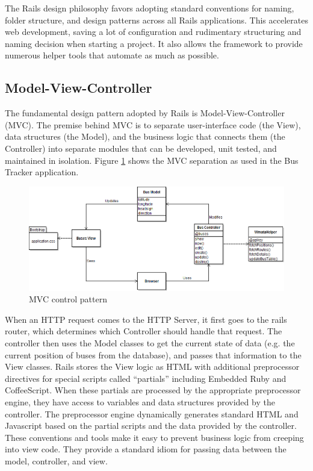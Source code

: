\documentclass[12pt]{article}
\begin{document}
The Rails design philosophy favors adopting standard conventions for naming, folder structure, and design patterns across all Rails applications.   This accelerates web development, saving a lot of configuration and rudimentary structuring and naming decision when starting a project.  It also allows the framework to provide numerous helper tools that automate as much as possible.


\subsection*{Model-View-Controller}
The fundamental design pattern adopted by Rails is Model-View-Controller (MVC).  The premise behind MVC is to separate user-interface code (the View), data structures (the Model), and the business logic that connects them (the Controller) into separate modules that can be developed, unit tested, and maintained in isolation.  Figure \ref{fig:MVC} shows the MVC separation as used in the Bus Tracker application.

\begin{figure}[ht]
	\centerline{\includegraphics[scale=0.55]{busTrackerUML.png}}
	\caption{MVC control pattern}
	\label{fig:MVC}
\end{figure}

When an HTTP request comes to the HTTP Server, it first goes to the rails router, which determines which Controller should handle that request.  The controller then uses the Model classes to get the current state of data (e.g. the current position of buses from the database), and passes that information to the View classes.  Rails stores the View logic as HTML with additional preprocessor directives for special scripts called ``partials'' including Embedded Ruby and CoffeeScript.  When these partials are processed by the appropriate preprocessor engine, they have access to variables and data structures provided by the controller.  The preprocessor engine dynamically generates standard HTML and Javascript based on the partial scripts and the data provided by the controller.  These conventions and tools make it easy to prevent business logic from creeping into view code.  They provide a standard idiom for passing data between the model, controller, and view.
\end{document}

